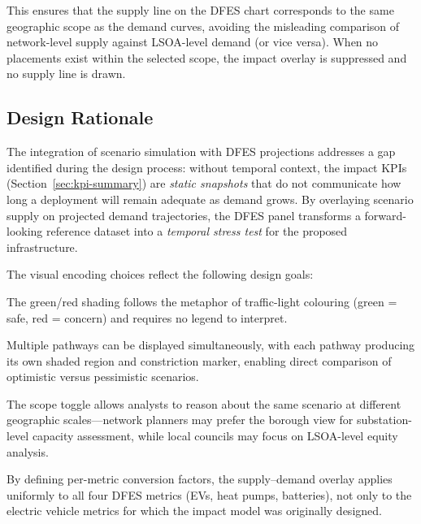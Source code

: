 \noindent This ensures that the supply line on the DFES chart corresponds to the same geographic scope as the demand curves, avoiding the misleading comparison of network-level supply against LSOA-level demand (or vice versa). When no placements exist within the selected scope, the impact overlay is suppressed and no supply line is drawn.

\subsection{Design Rationale}
\label{sec:dfes-rationale}

The integration of scenario simulation with DFES projections addresses a gap identified during the design process: without temporal context, the impact KPIs (Section~\ref{sec:kpi-summary}) are \emph{static snapshots} that do not communicate how long a deployment will remain adequate as demand grows. By overlaying scenario supply on projected demand trajectories, the DFES panel transforms a forward-looking reference dataset into a \emph{temporal stress test} for the proposed infrastructure.

The visual encoding choices reflect the following design goals:

\begin{description}[nosep]
    \item[Immediate legibility:] The green/red shading follows the metaphor of traffic-light colouring (green = safe, red = concern) and requires no legend to interpret.
    \item[Pathway comparison:] Multiple pathways can be displayed simultaneously, with each pathway producing its own shaded region and constriction marker, enabling direct comparison of optimistic versus pessimistic scenarios.
    \item[Geographic flexibility:] The scope toggle allows analysts to reason about the same scenario at different geographic scales---network planners may prefer the borough view for substation-level capacity assessment, while local councils may focus on LSOA-level equity analysis.
    \item[Metric generality:] By defining per-metric conversion factors, the supply--demand overlay applies uniformly to all four DFES metrics (EVs, heat pumps, batteries), not only to the electric vehicle metrics for which the impact model was originally designed.
\end{description}
